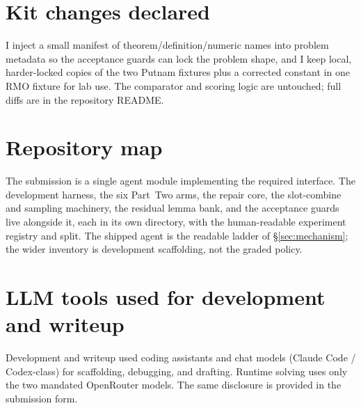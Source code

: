 \section{Kit changes declared}
\label{app:kit}

I inject a small manifest of theorem/definition/numeric names into problem
metadata so the acceptance guards can lock the problem shape, and I keep local,
harder-locked copies of the two Putnam fixtures plus a corrected constant in one
RMO fixture for lab use. The comparator and scoring logic are untouched; full
diffs are in the repository README.

\section{Repository map}
\label{app:repo}

The submission is a single agent module implementing the required interface. The
development harness, the six Part~Two arms, the repair core, the slot-combine and
sampling machinery, the residual lemma bank, and the acceptance guards live
alongside it, each in its own directory, with the human-readable experiment
registry and split. The shipped agent is the readable ladder of
\S\ref{sec:mechanism}; the wider inventory is development scaffolding, not the
graded policy.

\section{LLM tools used for development and writeup}
\label{app:llm}

Development and writeup used coding assistants and chat models (Claude Code /
Codex-class) for scaffolding, debugging, and drafting. Runtime solving uses only
the two mandated OpenRouter models. The same disclosure is provided in the
submission form.
